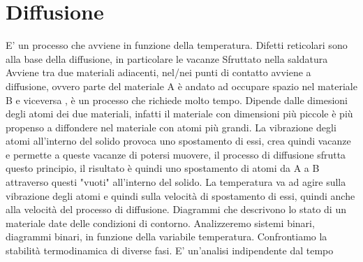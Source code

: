 \documentclass{article}%
\begin{document}
%
\normalsize%
\section{ Diffusione }%
\label{sec:Diffusione}%
E' un processo che avviene in funzione della temperatura.\newline%
%
Difetti reticolari sono alla base della diffusione, in particolare le vacanze\newline%
%
Sfruttato nella saldatura\newline%
%
Avviene tra due materiali adiacenti, nel/nei punti di contatto avviene a diffusione, ovvero parte del materiale A è andato ad occupare spazio nel materiale B e viceversa , è un processo che richiede molto tempo.\newline%
%
Dipende dalle dimesioni degli atomi dei due materiali, infatti il materiale con dimensioni più piccole è più  propenso a diffondere nel materiale con atomi più grandi.\newline%
%
La vibrazione degli atomi all'interno del solido provoca uno spostamento di essi, crea quindi vacanze e permette a queste vacanze di potersi muovere, il processo di diffusione sfrutta questo principio, il risultato è quindi uno spostamento di atomi da A a B attraverso questi "vuoti" all'interno del solido.\newline%
%
La temperatura va ad agire sulla vibrazione degli atomi e quindi sulla velocità di spostamento di essi, quindi anche alla velocità del processo di diffusione.\newline%
%
\newline%
%
\newline%
%
Diagrammi che descrivono lo stato di un materiale date delle condizioni di contorno.\newline%
%
Analizzeremo sistemi binari, diagrammi binari, in funzione della variabile temperatura.\newline%
%
Confrontiamo la stabilità termodinamica di diverse fasi.\newline%
%
E' un'analisi indipendente dal tempo\newline%
%
\newline%
%
\end{document}
